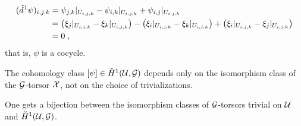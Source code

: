 \documentclass[a4paper,parskip=half,numbers=enddot, DIV=12]{scrreprt}
\begin{document}
\begin{align*}
	(\check{d}\hspace{0.06125em}^1\psi)_{i,j,k}&=\psi_{j,k}|_{U_{i,j,k}}-\psi_{i,k}|_{U_{i,j,k}}+\psi_{i,j}|_{U_{i,j,k}}\\
	&=\left(\xi_j|_{U_{i,j,k}}-\xi_k|_{U_{i,j,k}}\right)-\left(\xi_i|_{U_{i,j,k}}-\xi_k|_{U_{i,j,k}}\right)+\left(\xi_i|_{U_{i,j,k}}-\xi_j|_{U_{i,j,k}}\right)\\
	&=0\;,
\end{align*}
that is, $\psi$ is a cocycle.

\begin{prop}
	\begin{alphanumerate}
		\item {}The cohomology class $[\psi]\in \check{H}^1(\mathcal{U},\mathcal{G})$ depends only on the isomorphism class of the $\mathcal{G}$-torsor $\mathcal{X}$, not on the choice of trivializations.
		\item One gets a bijection between the isomorphism classes of $\mathcal{G}$-torsors trivial on $\mathcal{U}$ and $\check{H}^1(\mathcal{U},\mathcal{G})$.
	\end{alphanumerate}
\end{prop}
\end{document}
